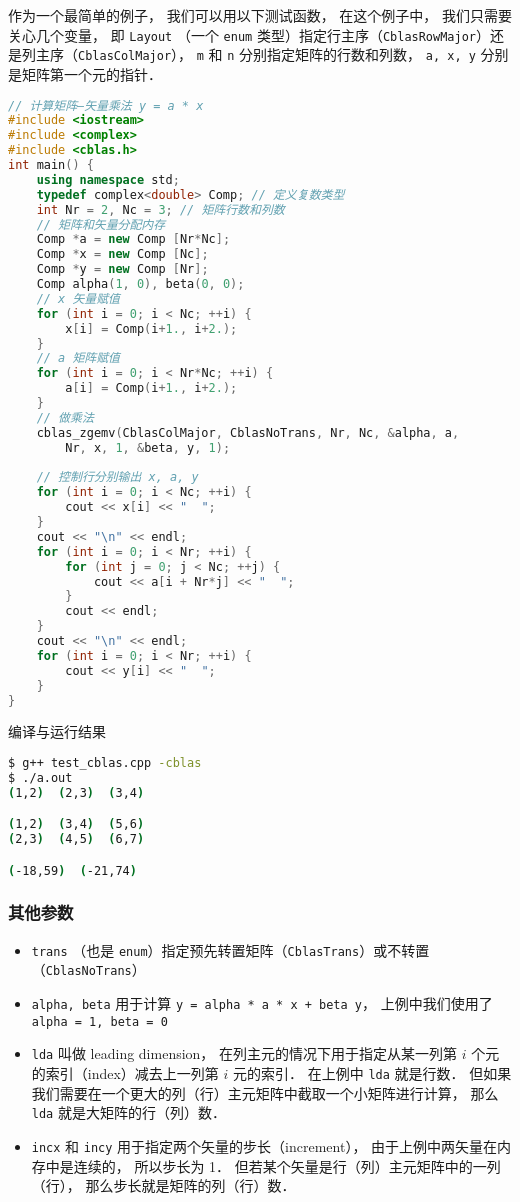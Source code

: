 作为一个最简单的例子， 我们可以用以下测试函数， 在这个例子中， 我们只需要关心几个变量， 即 \verb|Layout| （一个 \verb|enum| 类型）指定行主序（\verb|CblasRowMajor|）还是列主序（\verb|CblasColMajor|）， \verb|m| 和 \verb|n| 分别指定矩阵的行数和列数， \verb|a, x, y| 分别是矩阵第一个元的指针．
\begin{lstlisting}[language=cpp, caption=blas\_demo.cpp]
// 计算矩阵—矢量乘法 y = a * x
#include <iostream>
#include <complex>
#include <cblas.h>
int main() {
    using namespace std;
    typedef complex<double> Comp; // 定义复数类型
    int Nr = 2, Nc = 3; // 矩阵行数和列数
    // 矩阵和矢量分配内存
    Comp *a = new Comp [Nr*Nc];
    Comp *x = new Comp [Nc];
    Comp *y = new Comp [Nr];
    Comp alpha(1, 0), beta(0, 0);
    // x 矢量赋值
    for (int i = 0; i < Nc; ++i) {
        x[i] = Comp(i+1., i+2.);
    }
    // a 矩阵赋值
    for (int i = 0; i < Nr*Nc; ++i) {
        a[i] = Comp(i+1., i+2.);
    }
    // 做乘法
    cblas_zgemv(CblasColMajor, CblasNoTrans, Nr, Nc, &alpha, a,
        Nr, x, 1, &beta, y, 1);
        
    // 控制行分别输出 x, a, y
    for (int i = 0; i < Nc; ++i) {
        cout << x[i] << "  ";
    }
    cout << "\n" << endl;
    for (int i = 0; i < Nr; ++i) {
        for (int j = 0; j < Nc; ++j) {
            cout << a[i + Nr*j] << "  ";
        }
        cout << endl;
    }
    cout << "\n" << endl;
    for (int i = 0; i < Nr; ++i) {
        cout << y[i] << "  ";
    }
}
\end{lstlisting}

编译与运行结果
\begin{lstlisting}[language=bash]
$ g++ test_cblas.cpp -cblas
$ ./a.out
(1,2)  (2,3)  (3,4)

(1,2)  (3,4)  (5,6)
(2,3)  (4,5)  (6,7)

(-18,59)  (-21,74)
\end{lstlisting}

\subsubsection{其他参数}
\begin{itemize}
\item \verb|trans| （也是 \verb|enum|）指定预先转置矩阵（\verb|CblasTrans|）或不转置（\verb|CblasNoTrans|）
\item \verb|alpha, beta| 用于计算 \verb|y = alpha * a * x + beta y|， 上例中我们使用了 \verb|alpha = 1, beta = 0|
\item \verb|lda| 叫做 leading dimension， 在列主元的情况下用于指定从某一列第 $i$ 个元的索引（index）减去上一列第 $i$ 元的索引． 在上例中 \verb|lda| 就是行数． 但如果我们需要在一个更大的列（行）主元矩阵中截取一个小矩阵进行计算， 那么 \verb|lda| 就是大矩阵的行（列）数．
\item \verb|incx| 和 \verb|incy| 用于指定两个矢量的步长（increment）， 由于上例中两矢量在内存中是连续的， 所以步长为 1． 但若某个矢量是行（列）主元矩阵中的一列（行）， 那么步长就是矩阵的列（行）数．
\end{itemize}
